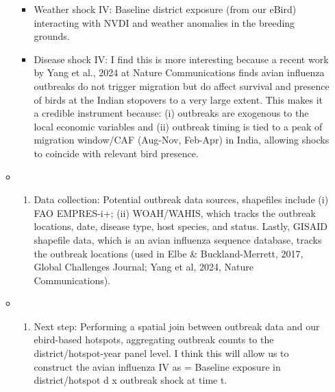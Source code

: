 \documentclass[
  letterpaper,
]{article}
\providecommand{\tightlist}{%
  \setlength{\itemsep}{0pt}\setlength{\parskip}{0pt}}\usepackage{longtable,booktabs,array}
\begin{document}
\begin{tcolorbox}
\begin{enumerate}
\begin{itemize}
    \begin{itemize}
    \tightlist
    \item
      Weather shock IV: Baseline district exposure (from our eBird)
      interacting with NVDI and weather anomalies in the breeding
      grounds.
    \item
      Disease shock IV: I find this is more interesting because a recent
      work by Yang et al., 2024 at Nature Communications finds avian
      influenza outbreaks do not trigger migration but do affect
      survival and presence of birds at the Indian stopovers to a very
      large extent. This makes it a credible instrument because: (i)
      outbreaks are exogenous to the local economic variables and (ii)
      outbreak timing is tied to a peak of migration window/CAF
      (Aug-Nov, Feb-Apr) in India, allowing shocks to coincide with
      relevant bird presence.
    \end{itemize}
  \item
    \begin{enumerate}
    \def\labelenumii{(\roman{enumii})}
    \setcounter{enumii}{2}
    \tightlist
    \item
      Data collection: Potential outbreak data sources, shapefiles
      include (i) FAO EMPRES-i+; (ii) WOAH/WAHIS, which tracks the
      outbreak locations, date, disease type, host species, and status.
      Lastly, GISAID shapefile data, which is an avian influenza
      sequence database, tracks the outbreak locations (used in Elbe \&
      Buckland-Merrett, 2017, Global Challenges Journal; Yang et al,
      2024, Nature Communications).
    \end{enumerate}
  \item
    \begin{enumerate}
    \def\labelenumii{(\roman{enumii})}
    \setcounter{enumii}{3}
    \tightlist
    \item
      Next step: Performing a spatial join between outbreak data and our
      ebird-based hotspots, aggregating outbreak counts to the
      district/hotspot-year panel level. I think this will allow us to
      construct the avian influenza IV as = Baseline exposure in
      district/hotspot d x outbreak shock at time t.
    \end{enumerate}
  \end{itemize}
\end{enumerate}

\end{tcolorbox}
\end{document}
